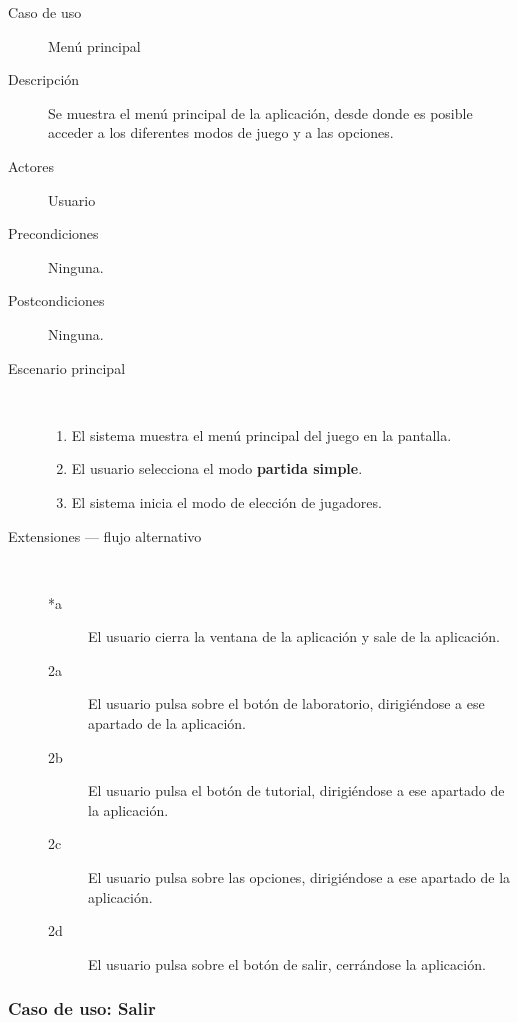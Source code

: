 \begin{description}
    \item[Caso de uso] Menú principal
    \item[Descripción] Se muestra el menú principal de la aplicación, desde donde es posible acceder a los
        diferentes modos de juego y a las opciones.
    \item[Actores] Usuario
    \item[Precondiciones] Ninguna.
    \item[Postcondiciones] Ninguna.
    \item[Escenario principal] $\quad$
        \begin{enumerate}
            \item El sistema muestra el menú principal del juego en la pantalla.
            \item El usuario selecciona el modo \textbf{partida simple}.
            \item El sistema inicia el modo de elección de jugadores.
        \end{enumerate}
    \item[Extensiones --- flujo alternativo] $\quad$
        \begin{description}
            \item[*a ] El usuario cierra la ventana de la aplicación y sale de la aplicación.
            \item[2a ] El usuario pulsa sobre el botón de laboratorio, dirigiéndose a ese apartado de la aplicación.
            \item[2b ] El usuario pulsa el botón de tutorial, dirigiéndose a ese apartado de la aplicación.
            \item[2c ] El usuario pulsa sobre las opciones, dirigiéndose a ese apartado de la aplicación.
            \item[2d ] El usuario pulsa sobre el botón de salir, cerrándose la aplicación.
        \end{description}
   
\end{description}

\subsubsection{Caso de uso: Salir}

